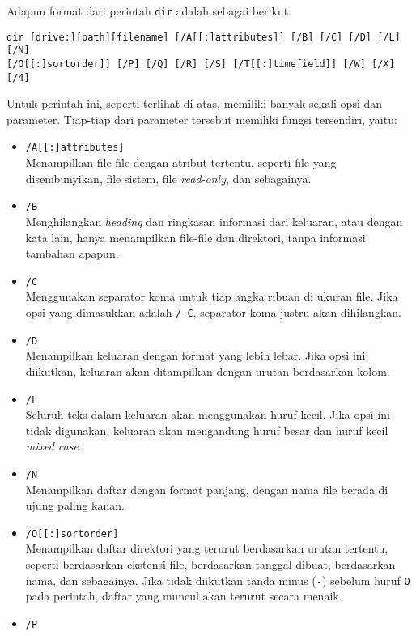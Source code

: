 \begin{itemize}
	Adapun format dari perintah \verb|dir| adalah sebagai berikut.\cite{mueller:2007:windowscommandline}
	
	\begin{verbatim}
dir [drive:][path][filename] [/A[[:]attributes]] [/B] [/C] [/D] [/L] [/N] 
[/O[[:]sortorder]] [/P] [/Q] [/R] [/S] [/T[[:]timefield]] [/W] [/X] [/4]
	\end{verbatim}
	
	Untuk perintah ini, seperti terlihat di atas, memiliki banyak sekali opsi dan parameter. Tiap-tiap dari parameter tersebut memiliki fungsi tersendiri, yaitu:
	\begin{itemize}
		\item \verb|/A[[:]attributes]|\\
		Menampilkan file-file dengan atribut tertentu, seperti file yang disembunyikan, file sistem, file \textit{read-only}, dan sebagainya.
		\item \verb|/B|\\
		Menghilangkan \textit{heading} dan ringkasan informasi dari keluaran, atau dengan kata lain, hanya menampilkan file-file dan direktori, tanpa informasi tambahan apapun.
		\item \verb|/C|\\
		Menggunakan separator koma untuk tiap angka ribuan di ukuran file. Jika opsi yang dimasukkan adalah \verb|/-C|, separator koma justru akan dihilangkan.
		\item \verb|/D|\\
		Menampilkan keluaran dengan format yang lebih lebar. Jika opsi ini diikutkan, keluaran akan ditampilkan dengan urutan berdasarkan kolom.
		\item \verb|/L|\\
		Seluruh teks dalam keluaran akan menggunakan huruf kecil. Jika opsi ini tidak digunakan, keluaran akan mengandung huruf besar dan huruf kecil \textit{mixed case}.
		\item \verb|/N|\\
		Menampilkan daftar dengan format panjang, dengan nama file berada di ujung paling kanan.
		\item \verb|/O[[:]sortorder]|\\
		Menampilkan daftar direktori yang terurut berdasarkan urutan tertentu, seperti berdasarkan ekstensi file, berdasarkan tanggal dibuat, berdasarkan nama, dan sebagainya. Jika tidak diikutkan tanda minus (\verb|-|) sebelum huruf \verb|O| pada perintah, daftar yang muncul akan terurut secara menaik.
		\item \verb|/P|\\

\end{itemize}
\end{itemize}
